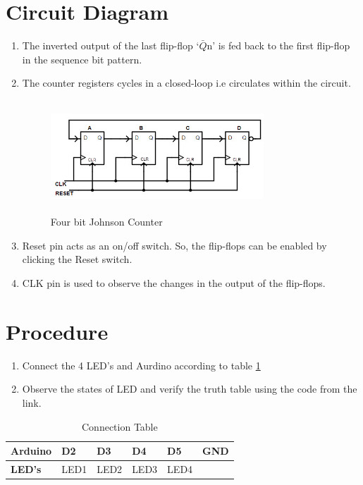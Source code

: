 \documentclass[journal,12pt,twocolumn]{IEEEtran}
\begin{document}
    \vspace{2.5cm}   



\section{Circuit Diagram}
\begin{enumerate}
\item The inverted output of the last flip-flop ‘$\bar{Q}$n’ is fed back to the first flip-flop in the sequence bit pattern. 
\item The counter registers cycles in a closed-loop i.e circulates within the circuit.
\begin{figure}[h]
    \centering
    \includegraphics[width=8cm, height=4.2cm]{counter.jpg}
    
    \caption{Four bit Johnson Counter}

\end{figure}
\item Reset pin acts as an on/off switch. So, the flip-flops can be enabled by clicking the Reset switch.

\item CLK pin is used to observe the changes in the output of the flip-flops.
\end{enumerate}



\section{Procedure}
\begin{enumerate}
\item Connect the 4 LED's and Aurdino according to table \ref{table:1}
\item Observe the states of LED and verify the truth table using the code from the link.



\end{enumerate}


\begin{table}[h]
\centering
\large
\begin{tabular}{|l|l|l|l|l|l|}
\hline
\textbf{Arduino} & D2   & D3   & D4   & D5   & GND \\ \hline
\textbf{LED's}   & LED1 & LED2 & LED3 & LED4 &     \\ \hline
\end{tabular}
\caption{Connection Table}
\label{table:1}
\end{table} 
\end{document}
